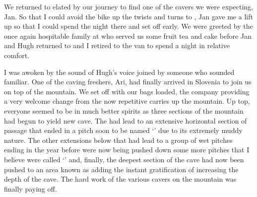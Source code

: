 We returned to  elated by our journey to find one of the cavers we
were expecting, Jan. So that I could avoid the bike up the twists and
turns to , Jan gave me a lift up so that I could spend the night
there and set off early. We were greeted by the once again hospitable
family at  who served us some fruit tea and cake before Jan and
Hugh returned to  and I retired to the van to spend a night in
relative comfort.



I was awoken by the sound of Hugh's voice joined by someone who sounded
familiar. One of the caving freshers, Ari, had finally arrived in
Slovenia to join us on top of the mountain. We set off with our bags
loaded, the company providing a very welcome change from the now
repetitive carries up the mountain. Up top, everyone seemed to be in
much better spirits as three sections of the mountain had begun to yield
new cave. The  had lead to an extensive horizontal
section of passage that ended in a pitch soon to be named `' due to its extremely muddy nature. The other extensions
below  that had lead to a group of wet pitches ending in
 the year before were now being pushed down some more
pitches that I believe were called `' and, finally,
the deepest section of the cave had now been pushed to an area known as
 adding the instant gratification of increasing the
depth of the cave. The hard work of the various cavers on the mountain
was finally paying off.

